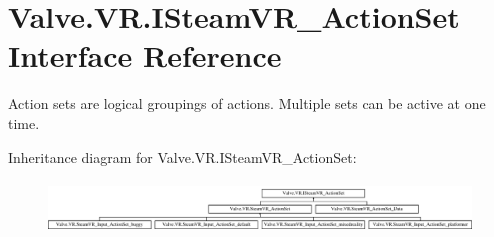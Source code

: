 \hypertarget{interface_valve_1_1_v_r_1_1_i_steam_v_r___action_set}{}\section{Valve.\+V\+R.\+I\+Steam\+V\+R\+\_\+\+Action\+Set Interface Reference}
\label{interface_valve_1_1_v_r_1_1_i_steam_v_r___action_set}


Action sets are logical groupings of actions. Multiple sets can be active at one time.  


Inheritance diagram for Valve.\+V\+R.\+I\+Steam\+V\+R\+\_\+\+Action\+Set\+:\begin{figure}[H]
\begin{center}
\leavevmode
\includegraphics[height=1.409396cm]{interface_valve_1_1_v_r_1_1_i_steam_v_r___action_set}
\end{center}
\end{figure}
